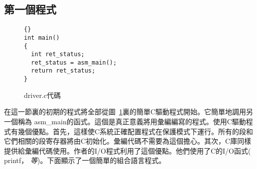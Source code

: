 \subsection{第一個程式}

\begin{figure}[t]
\begin{lstlisting}[frame=tlrb]{}
int main()
{
  int ret_status;
  ret_status = asm_main();
  return ret_status;
}
\end{lstlisting}
\caption{{\code driver.c}代碼 \label{fig:driverProg}
}
\end{figure}

在這一節裏的初期的程式將全部從圖~\ref{fig:driverProg}裏的簡單C驅動程式開始。它簡單地調用另一個稱為{\code
asm\_main}的函式。這個是真正意義將用彙編編寫的程式。使用C驅動程式有幾個優點。首先，這樣使C系統正確配置程式在保護模式下運行。所有的段和它們相關的段寄存器將由C初始化。彙編代碼不需要為這個擔心。其次，C庫同樣提供給彙編代碼使用。作者的I/O程式利用了這個優點。他們使用了C的I/O函式({\code
printf}， {\em 等})。下面顯示了一個簡單的組合語言程式。

